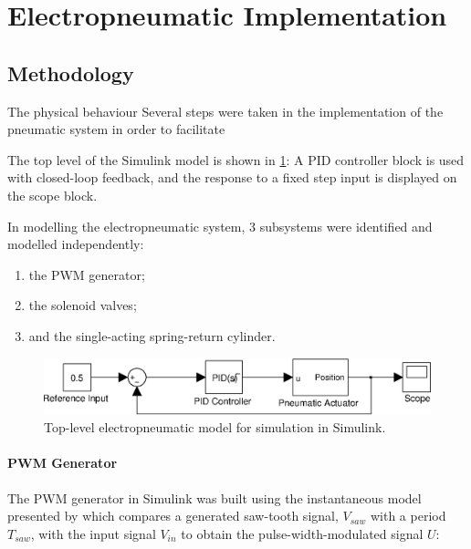 \section{Electropneumatic Implementation}


\subsection{Methodology}

The physical behaviour 
Several steps were taken in the implementation of the pneumatic system in order to facilitate

The top level of the Simulink model is shown in \ref{fig:pneumatics_top_level}: A PID controller block is used with closed-loop feedback, and the response to a fixed step input is displayed on the scope block.

In modelling the electropneumatic system, 3 subsystems were identified and modelled independently:

\begin{enumerate}
  \item the PWM generator;
  \item the solenoid valves;
  \item and the single-acting spring-return cylinder.
\end{enumerate}

\begin{figure}[h]
\centering
\includegraphics[scale=1]{implementation/figures/pneumatic_modelling1.eps}
\caption{Top-level electropneumatic model for simulation in Simulink.}
\label{fig:pneumatics_top_level}
\end{figure}

\paragraph{PWM Generator}

The PWM generator in Simulink was built using the instantaneous model presented by \citet{valve_models} which compares a generated saw-tooth signal, $V_{saw}$ with a period $T_{saw}$, with the input signal $V_{in}$ to obtain the pulse-width-modulated signal $U$:


